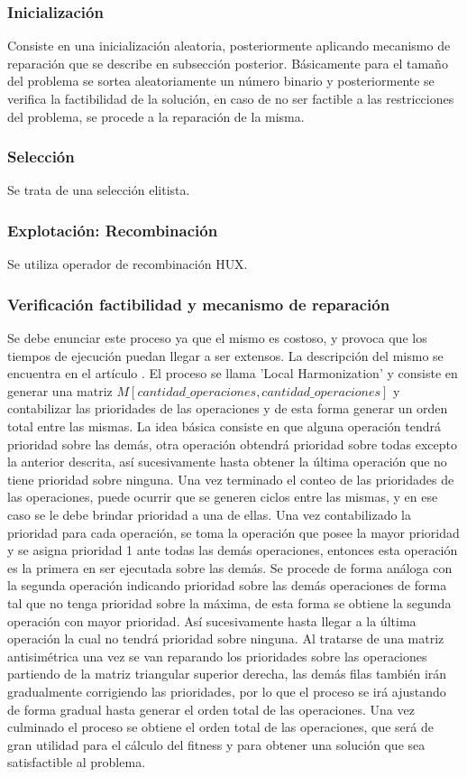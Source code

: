 \documentclass[journal]{IEEEtran}
\begin{document}
\subsubsection{Inicialización}
Consiste en una inicialización aleatoria, posteriormente aplicando mecanismo de reparación que se describe en subsección posterior. Básicamente para el tamaño del problema se sortea aleatoriamente un número binario y posteriormente se verifica la factibilidad de la solución, en caso de no ser factible a las restricciones del problema, se procede a la reparación de la misma.

\subsubsection{Selección}
Se trata de una selección elitista.

\subsubsection{Explotación: Recombinación}
Se utiliza operador de recombinación HUX.

\subsubsection{Verificación factibilidad y mecanismo de reparación}
Se debe enunciar este proceso ya que el mismo es costoso, y provoca que los tiempos de ejecución puedan llegar a ser extensos.
La descripción del mismo se encuentra en el artículo \cite{url:binaria}. El proceso se llama 'Local Harmonization' y consiste en generar una matriz $M[cantidad\_operaciones, cantidad\_operaciones]$ y contabilizar las prioridades de las operaciones y de esta forma generar un orden total entre las mismas. La idea básica consiste en que alguna operación tendrá prioridad sobre las demás, otra operación obtendrá prioridad sobre todas excepto la anterior descrita, así sucesivamente hasta obtener la última operación que no tiene prioridad sobre ninguna. Una vez terminado el conteo de las prioridades de las operaciones, puede ocurrir que se generen ciclos entre las mismas, y en ese caso se le debe brindar prioridad a una de ellas. Una vez contabilizado la prioridad para cada operación, se toma la operación que posee la mayor prioridad y se asigna prioridad 1 ante todas las demás operaciones, entonces esta operación es la primera en ser ejecutada sobre las demás. Se procede de forma análoga con la segunda operación indicando prioridad sobre las demás operaciones de forma tal que no tenga prioridad sobre la máxima, de esta forma se obtiene la segunda operación con mayor prioridad. Así sucesivamente hasta llegar a la última operación la cual no tendrá prioridad sobre ninguna. Al tratarse de una matriz antisimétrica una vez se van reparando los prioridades sobre las operaciones partiendo de la matriz triangular superior derecha, las demás filas también irán gradualmente corrigiendo las prioridades, por lo que el proceso se irá ajustando de forma gradual hasta generar el orden total de las operaciones.
Una vez culminado el proceso se obtiene el orden total de las operaciones, que será de gran utilidad para el cálculo del fitness y para obtener una solución que sea satisfactible al problema.
\end{document}
